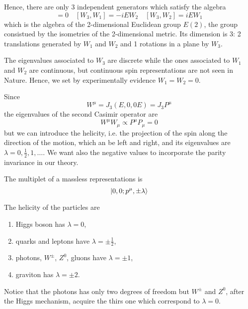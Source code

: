     Hence, there are only 3 independent generators which satisfy the algebra
    \begin{equation*}
        [W_1, W_2] = 0 \quad [W_3, W_1] = - i E W_2 \quad [W_3, W_2] = i E W_1
    \end{equation*}
    which is the algebra of the 2-dimensional Euclidean group $E(2)$, the group consistued by the isometries of the 2-dimensional metric. Its dimension is 3: 2 translations generated by $W_1$ and $W_2$ and 1 rotations in a plane by $W_3$. 

    The eigenvalues associated to $W_3$ are discrete while the ones associated to $W_1$ and $W_2$ are continuous, but continuous spin representations are not seen in Nature. Hence, we set by experimentally evidence $W_1 = W_2 = 0$. 

    Since
    \begin{equation}
        W^\mu = J_3 (E, 0, 0 E) = J_3 P^\mu 
    \end{equation}
    the eigenvalues of the second Casimir operator are 
    \begin{equation*}
        W^\mu W_\mu \propto P^\mu P_\mu = 0
    \end{equation*}
    but we can introduce the helicity, i.e. the projection of the spin along the direction of the motion, which an be left and right, and its eigenvalues are $\lambda = 0, \frac{1}{2}, 1, \ldots$. We want also the negative values to incorporate the parity invariance in our theory. 
    
    The multiplet of a massless representations is 
    \begin{equation*}
        \vert0, 0 ; p^\mu, \pm \lambda\rangle
    \end{equation*}

    The helicity of the particles are 
    \begin{enumerate}
        \item Higgs boson has $\lambda = 0$,
        \item quarks and leptons have $\lambda = \pm \frac{1}{2}$,
        \item photons, $W^\pm$, $Z^0$, gluons have $\lambda = \pm 1$,
        \item graviton has $\lambda = \pm 2$.
    \end{enumerate}

    Notice that the photons has only two degrees of freedom but $W^\pm$ and $Z^0$, after the Higgs mechanism, acquire the thirs one which correspond to $\lambda = 0$.

